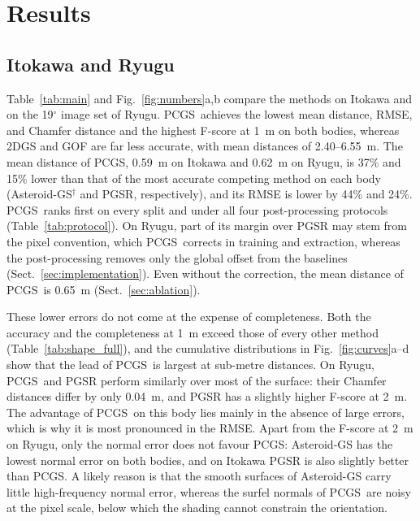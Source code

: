\documentclass[fleqn,usenatbib]{aa}
\newcommand{\pcgs}{PCGS}
\begin{document}
\section{Results}
\label{sec:results}

\subsection{Itokawa and Ryugu}
\label{sec:accuracy}

Table~\ref{tab:main} and Fig.~\ref{fig:numbers}a,b compare the methods on Itokawa and on the 19$^\circ$ image set of
Ryugu. \pcgs\ achieves the lowest mean distance, RMSE, and Chamfer distance and the highest F-score at 1~m on both
bodies, whereas 2DGS and GOF are far less accurate, with mean distances of 2.40--6.55~m. The mean distance of \pcgs, 0.59~m on Itokawa and 0.62~m on Ryugu, is 37\% and 15\% lower than that of the most accurate competing method on
each body (Asteroid-GS$^\dagger$ and PGSR, respectively), and its RMSE is lower by 44\% and 24\%. \pcgs\ ranks first on
every split and under all four post-processing protocols (Table~\ref{tab:protocol}). On Ryugu, part of its margin over
PGSR may stem from the pixel convention, which \pcgs\ corrects in training and extraction, whereas the post-processing
removes only the global offset from the baselines (Sect.~\ref{sec:implementation}). Even without the correction, the mean distance of \pcgs\ is 0.65~m (Sect.~\ref{sec:ablation}).

These lower errors do not come at the expense of completeness. Both the accuracy and the completeness at 1~m exceed
those of every other method (Table~\ref{tab:shape_full}), and the cumulative distributions in
Fig.~\ref{fig:curves}a--d show that the lead of \pcgs\ is largest at sub-metre distances. On Ryugu, \pcgs\ and PGSR
perform similarly over most of the surface: their Chamfer distances differ by only 0.04~m, and PGSR has a slightly
higher F-score at 2~m. The advantage of \pcgs\ on this body lies mainly in the absence of large errors, which is why it
is most pronounced in the RMSE. Apart from the F-score at 2~m on Ryugu, only the normal error does not favour \pcgs:
Asteroid-GS has the lowest normal error on both bodies, and on Itokawa PGSR is also slightly better than \pcgs. A
likely reason is that the smooth surfaces of Asteroid-GS carry little high-frequency normal error, whereas the surfel
normals of \pcgs\ are noisy at the pixel scale, below which the shading cannot constrain the orientation.
\end{document}
